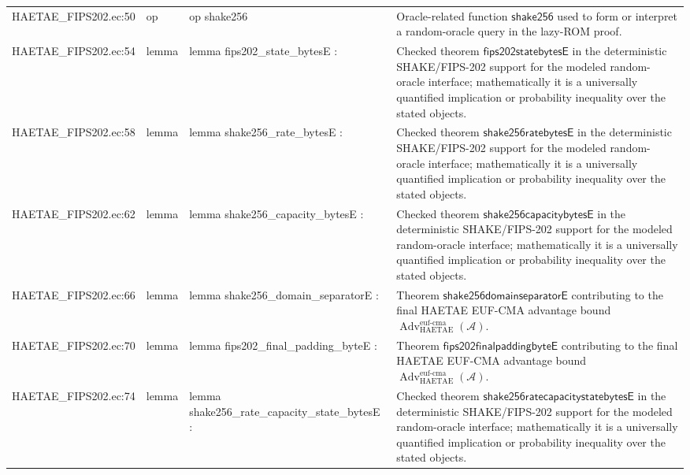 \documentclass[10pt]{article}
\newcommand{\Adv}{\operatorname{Adv}}
\begin{document}
\begin{longtable}{L{0.11\textwidth}L{0.055\textwidth}L{0.385\textwidth}L{0.41\textwidth}}
HAETAE\_\allowbreak{}FIPS202.\allowbreak{}ec:\allowbreak{}50 & op & {\ttfamily\scriptsize op shake256} & Oracle-related function $\mathsf{shake256}$ used to form or interpret a random-oracle query in the lazy-ROM proof. \\
HAETAE\_\allowbreak{}FIPS202.\allowbreak{}ec:\allowbreak{}54 & lemma & {\ttfamily\scriptsize lemma fips202\_\allowbreak{}state\_\allowbreak{}bytesE :} & Checked theorem $\mathsf{fips202statebytesE}$ in the deterministic SHAKE/FIPS-202 support for the modeled random-oracle interface; mathematically it is a universally quantified implication or probability inequality over the stated objects. \\
HAETAE\_\allowbreak{}FIPS202.\allowbreak{}ec:\allowbreak{}58 & lemma & {\ttfamily\scriptsize lemma shake256\_\allowbreak{}rate\_\allowbreak{}bytesE :} & Checked theorem $\mathsf{shake256ratebytesE}$ in the deterministic SHAKE/FIPS-202 support for the modeled random-oracle interface; mathematically it is a universally quantified implication or probability inequality over the stated objects. \\
HAETAE\_\allowbreak{}FIPS202.\allowbreak{}ec:\allowbreak{}62 & lemma & {\ttfamily\scriptsize lemma shake256\_\allowbreak{}capacity\_\allowbreak{}bytesE :} & Checked theorem $\mathsf{shake256capacitybytesE}$ in the deterministic SHAKE/FIPS-202 support for the modeled random-oracle interface; mathematically it is a universally quantified implication or probability inequality over the stated objects. \\
HAETAE\_\allowbreak{}FIPS202.\allowbreak{}ec:\allowbreak{}66 & lemma & {\ttfamily\scriptsize lemma shake256\_\allowbreak{}domain\_\allowbreak{}separatorE :} & Theorem $\mathsf{shake256domainseparatorE}$ contributing to the final HAETAE EUF-CMA advantage bound $\Adv_{\mathrm{HAETAE}}^{\mathrm{euf\mbox{-}cma}}(\mathcal A)$. \\
HAETAE\_\allowbreak{}FIPS202.\allowbreak{}ec:\allowbreak{}70 & lemma & {\ttfamily\scriptsize lemma fips202\_\allowbreak{}final\_\allowbreak{}padding\_\allowbreak{}byteE :} & Theorem $\mathsf{fips202finalpaddingbyteE}$ contributing to the final HAETAE EUF-CMA advantage bound $\Adv_{\mathrm{HAETAE}}^{\mathrm{euf\mbox{-}cma}}(\mathcal A)$. \\
HAETAE\_\allowbreak{}FIPS202.\allowbreak{}ec:\allowbreak{}74 & lemma & {\ttfamily\scriptsize lemma shake256\_\allowbreak{}rate\_\allowbreak{}capacity\_\allowbreak{}state\_\allowbreak{}bytesE :} & Checked theorem $\mathsf{shake256ratecapacitystatebytesE}$ in the deterministic SHAKE/FIPS-202 support for the modeled random-oracle interface; mathematically it is a universally quantified implication or probability inequality over the stated objects. \\

\end{longtable}
\end{document}
